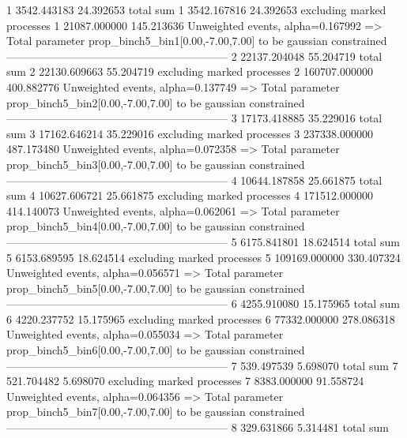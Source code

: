 1          3542.443183     24.392653       total sum                     
1          3542.167816     24.392653       excluding marked processes    
1          21087.000000    145.213636      Unweighted events, alpha=0.167992
  => Total parameter prop_binch5_bin1[0.00,-7.00,7.00] to be gaussian constrained
------------------------------------------------------------
2          22137.204048    55.204719       total sum                     
2          22130.609663    55.204719       excluding marked processes    
2          160707.000000   400.882776      Unweighted events, alpha=0.137749
  => Total parameter prop_binch5_bin2[0.00,-7.00,7.00] to be gaussian constrained
------------------------------------------------------------
3          17173.418885    35.229016       total sum                     
3          17162.646214    35.229016       excluding marked processes    
3          237338.000000   487.173480      Unweighted events, alpha=0.072358
  => Total parameter prop_binch5_bin3[0.00,-7.00,7.00] to be gaussian constrained
------------------------------------------------------------
4          10644.187858    25.661875       total sum                     
4          10627.606721    25.661875       excluding marked processes    
4          171512.000000   414.140073      Unweighted events, alpha=0.062061
  => Total parameter prop_binch5_bin4[0.00,-7.00,7.00] to be gaussian constrained
------------------------------------------------------------
5          6175.841801     18.624514       total sum                     
5          6153.689595     18.624514       excluding marked processes    
5          109169.000000   330.407324      Unweighted events, alpha=0.056571
  => Total parameter prop_binch5_bin5[0.00,-7.00,7.00] to be gaussian constrained
------------------------------------------------------------
6          4255.910080     15.175965       total sum                     
6          4220.237752     15.175965       excluding marked processes    
6          77332.000000    278.086318      Unweighted events, alpha=0.055034
  => Total parameter prop_binch5_bin6[0.00,-7.00,7.00] to be gaussian constrained
------------------------------------------------------------
7          539.497539      5.698070        total sum                     
7          521.704482      5.698070        excluding marked processes    
7          8383.000000     91.558724       Unweighted events, alpha=0.064356
  => Total parameter prop_binch5_bin7[0.00,-7.00,7.00] to be gaussian constrained
------------------------------------------------------------
8          329.631866      5.314481        total sum                     
